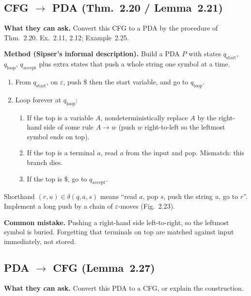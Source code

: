 \documentclass[11pt,a4paper]{article}
\newcommand{\eps}{\varepsilon}
\begin{document}
\subsection{CFG $\to$ PDA (Thm.~2.20 / Lemma~2.21)}

\textbf{What they can ask.}
Convert this CFG to a PDA by the procedure of Thm.~2.20.
Ex.~2.11, 2.12; Example~2.25.

\textbf{Method (Sipser's informal description).}
Build a PDA $P$ with states $q_{\mathrm{start}}$, $q_{\mathrm{loop}}$,
$q_{\mathrm{accept}}$ plus extra states that push a whole string
one symbol at a time.
\begin{enumerate}
  \item From $q_{\mathrm{start}}$, on $\eps$, push $\$$ then the
        start variable, and go to $q_{\mathrm{loop}}$.
  \item Loop forever at $q_{\mathrm{loop}}$:
        \begin{enumerate}[nosep]
          \item If the top is a variable $A$,
                nondeterministically replace $A$ by the right-hand
                side of some rule $A\to w$ (push $w$ right-to-left
                so the leftmost symbol ends on top).
          \item If the top is a terminal $a$, read $a$ from the
                input and pop. Mismatch: this branch dies.
          \item If the top is $\$$, go to $q_{\mathrm{accept}}$.
        \end{enumerate}
\end{enumerate}
Shorthand $(r,u)\in\delta(q,a,s)$ means ``read $a$, pop $s$, push
the string $u$, go to $r$''. Implement a long push by a chain of
$\eps$-moves (Fig.~2.23).

\textbf{Common mistake.}
Pushing a right-hand side left-to-right, so the leftmost symbol
is buried. Forgetting that terminals on top are matched against
input immediately, not stored.

\subsection{PDA $\to$ CFG (Lemma~2.27)}

\textbf{What they can ask.}
Convert this PDA to a CFG, or explain the construction.
\end{document}
